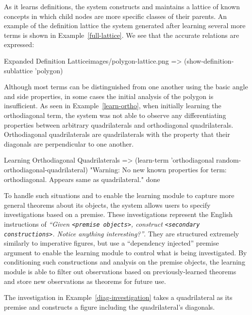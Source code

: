 As it learns definitions, the system constructs and maintains a
lattice of known concepts in which child nodes are more specific
classes of their parents. An example of the definition lattice the
system generated after learning several more terms is shown in
Example~\ref{full-lattice}. We see that the accurate relations are
expressed:

\begin{img-example}
[label=full-lattice,
breakable=false,
comment style={size=fbox,frame hidden,height=8.5cm}]
{Expanded Definition Lattice}{images/polygon-lattice.png}
=> (show-definition-sublattice 'polygon)
\end{img-example}

Although most terms can be distinguished from one another using the
basic angle and side properties, in some cases the initial analysis of
the polygon is insufficient. As seen in Example~\ref{learn-ortho},
when initially learning the orthodiagonal term, the system was not
able to observe any differentiating properties between arbitrary
quadrilaterals and orthodiagonal quadrilaterals. Orthodiagonal
quadrilaterals are quadrilaterals with the property that their
diagonals are perpendicular to one another.

\begin{repl-example}
[label=learn-ortho]
{Learning Orthodiagonal Quadrilaterals}
=> (learn-term 'orthodiagonal random-orthodiagonal-quadrilateral)
"Warning: No new known properties for term: orthodiagonal. Appears same as quadrilateral."
done

\end{repl-example}

To handle such situations and to enable the learning module to capture
more general theorems about its objects, the system allows users to
specify investigations based on a premise. These investigations
represent the English instructions of \emph{``Given \texttt{<premise
    objects>}, construct \texttt{<secondary constructions>}. Notice
  anything interesting?''}. They are structured extremely similarly to
imperative figures, but use a ``dependency injected'' premise argument
to enable the learning module to control what is being investigated.
By conditioning such constructions and analysis on the premise
objects, the learning module is able to filter out observations based
on previously-learned theorems and store new observations as theorems
for future use.

The investigation in Example~\ref{diag-investigation} takes a
quadrilateral as its premise and constructs a figure including the
quadrilateral's diagonals.

